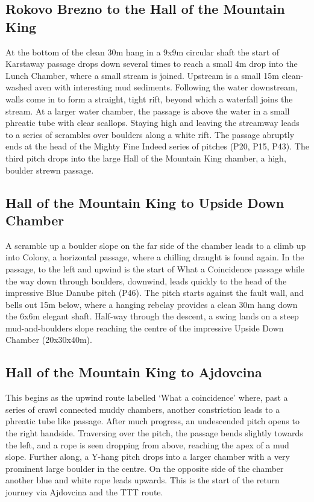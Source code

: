 \subsection{Rokovo Brezno to the Hall of the Mountain King}
 At the bottom of the clean 30m hang in a 9x9m circular shaft the start of Karstaway passage drops down several times to reach a small 4m drop into the Lunch Chamber, where a small stream is joined. Upstream is a small 15m clean-washed aven with interesting mud sediments. Following the water downstream, walls come in to form a straight, tight rift, beyond which a waterfall joins the stream. At a larger water chamber, the passage is above the water in a small phreatic tube with clear scallops. Staying high and leaving the streamway leads to a series of scrambles over boulders along a white rift. The passage abruptly ends at the head of the Mighty Fine Indeed series of pitches (P20, P15, P43). The third pitch drops into the large Hall of the Mountain King chamber, a high, boulder strewn passage.

\subsection{Hall of the Mountain King to Upside Down Chamber}
A scramble up a boulder slope on the far side of the chamber leads to a climb up into Colony, a horizontal passage, where a chilling draught is found again. In the passage, to the left and upwind is the start of What a Coincidence passage while the way down through boulders, downwind, leads quickly to the head of the impressive Blue Danube pitch (P46). The pitch starts against the fault wall, and bells out 15m below, where a hanging rebelay provides a clean 30m hang down the 6x6m elegant shaft. Half-way through the descent, a swing lands on a steep mud-and-boulders slope reaching the centre of the impressive Upside Down Chamber (20x30x40m).

\subsection{Hall of the Mountain King to Ajdovcina}
This begins as the upwind route labelled ‘What a coincidence’ where, past a series of crawl connected muddy chambers, another constriction leads to a phreatic tube like passage. After much progress, an undescended pitch opens to the right handside. Traversing over the pitch, the passage bends slightly towards the left, and a rope is seen dropping from above, reaching the apex of a mud slope. Further along, a Y-hang pitch drops into a larger chamber with a very prominent large boulder in the centre. On the opposite side of the chamber another blue and white rope leads upwards. This is the start of the return journey via Ajdovcina and the TTT route.

